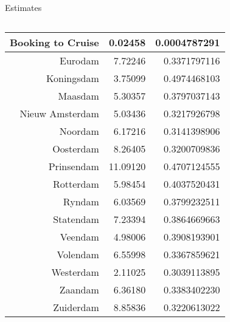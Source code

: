 \documentclass{beamer}
\begin{document}
\begin{frame}{Estimates}
\begin{columns}
\begin{column}{.5\textwidth}
{\begin{tabular}{rrr}
						Booking to Cruise & 0.02458 & 0.0004787291 \\
						\hline 
						Eurodam & 7.72246 & 0.3371797116 \\
						Koningsdam & 3.75099 & 0.4974468103 \\
						Maasdam & 5.30357 & 0.3797037143 \\
						Nieuw  Amsterdam & 5.03436 & 0.3217926798 \\
						Noordam & 6.17216 & 0.3141398906 \\
						Oosterdam & 8.26405 & 0.3200709836 \\
						Prinsendam & 11.09120 & 0.4707124555 \\
						Rotterdam & 5.98454 & 0.4037520431 \\
						Ryndam & 6.03569 & 0.3799232511 \\
						Statendam & 7.23394 & 0.3864669663 \\
						Veendam & 4.98006 & 0.3908193901 \\
						Volendam & 6.55998 & 0.3367859621 \\
						Westerdam & 2.11025 & 0.3039113895 \\
						Zaandam & 6.36180 & 0.3383402230 \\
						Zuiderdam & 8.85836 & 0.3220613022 \\
					\end{tabular}
				}
			\end{column}
		\end{columns}
	\end{frame}
	
\end{document}
